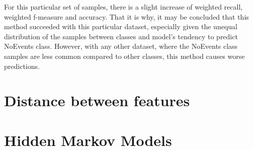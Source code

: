 For this particular set of samples, there is a slight increase of weighted recall, weighted f-measure and accuracy. That it is why, it may be concluded that this method succeeded with this particular dataset, especially given the unequal distribution of the samples between classes and model's tendency to predict NoEvents class. However, with any other dataset, where the NoEvents class samples are less common compared to other classes, this method causes worse predictions.

\section{Distance between features}


\section{Hidden Markov Models}

